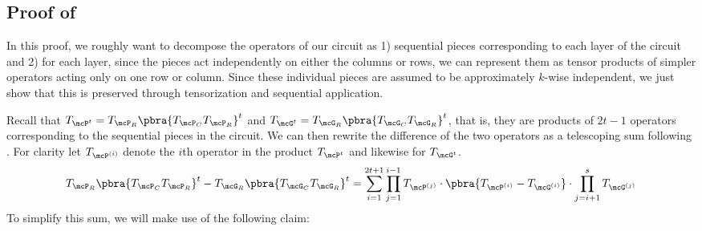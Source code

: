 \subsection{Proof of }
\label{subsec:reduction}

In this proof, we roughly want to decompose the operators of our circuit as 1) sequential pieces corresponding to each layer of the circuit and 2) for each layer, since the pieces act independently on either the columns or rows, we can represent them as tensor products of simpler operators acting only on one row or column. Since these individual pieces are assumed to be approximately $k$-wise independent, we just show that this is preserved through tensorization and sequential application. 

Recall that $T_{\mcP^t} = T_{\mcP_R}\pbra{T_{\mcP_C}T_{\mcP_R}}^t$ and $T_{\mcG^t} = T_{\mcG_R}\pbra{T_{\mcG_C}T_{\mcG_R}}^t$, that is, they are products of $2t-1$ operators corresponding to the sequential pieces in the circuit. We can then rewrite the difference of the two operators as a telescoping sum following . For clarity let $T_{\mcP^{(i)}}$ denote the $i$th operator in the product $T_{\mcP^t}$ and likewise for $T_{\mcG^t}$.
\begin{equation*}
    T_{\mcP_R}\pbra{T_{\mcP_C}T_{\mcP_R}}^t - T_{\mcG_R}\pbra{T_{\mcG_C}T_{\mcG_R}}^t = \sum_{i=1}^{2t+1} \prod_{j=1}^{i-1} T_{\mcP^{(j)}} \cdot \pbra{T_{\mcP^{(i)}} - T_{\mcG^{(i)}}} \cdot \prod_{j = i+1}^s T_{\mcG^{(j)}}
\end{equation*}
To simplify this sum, we will make use of the following claim:

